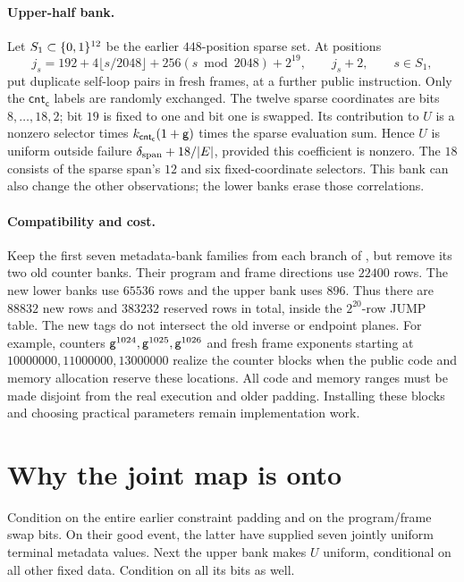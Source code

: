 \documentclass[11pt]{article}
\begin{document}
\paragraph{Upper-half bank.} Let $S_1\subset\{0,1\}^{12}$ be the earlier $448$-position sparse set. At positions
\[
 j_s=192+4\lfloor s/2048\rfloor+256(s\bmod2048)+2^{19},
 \qquad j_s+2,\qquad s\in S_1,
\]
put duplicate self-loop pairs in fresh frames, at a further public instruction. Only the $\mathsf{cnt_c}$ labels are randomly exchanged. The twelve sparse coordinates are bits $8,\ldots,18,2$; bit $19$ is fixed to one and bit one is swapped. Its contribution to $U$ is a nonzero selector times $k_{\mathsf{cnt_c}}(1+\mathsf{g})$ times the sparse evaluation sum. Hence $U$ is uniform outside failure $\delta_{\mathrm{span}}+18/|E|$, provided this coefficient is nonzero. The $18$ consists of the sparse span's $12$ and six fixed-coordinate selectors. This bank can also change the other observations; the lower banks erase those correlations.

\paragraph{Compatibility and cost.} Keep the first seven metadata-bank families from each branch of , but remove its two old counter banks. Their program and frame directions use $22400$ rows. The new lower banks use $65536$ rows and the upper bank uses $896$. Thus there are $88832$ new rows and $383232$ reserved rows in total, inside the $2^{20}$-row JUMP table. The new tags do not intersect the old inverse or endpoint planes. For example, counters $\mathsf{g}^{1024},\mathsf{g}^{1025},\mathsf{g}^{1026}$ and fresh frame exponents starting at $10000000,11000000,13000000$ realize the counter blocks when the public code and memory allocation reserve these locations. All code and memory ranges must be made disjoint from the real execution and older padding. Installing these blocks and choosing practical parameters remain implementation work.

\section{Why the joint map is onto}

Condition on the entire earlier constraint padding and on the program/frame swap bits. On their good event, the latter have supplied seven jointly uniform terminal metadata values. Next the upper bank makes $U$ uniform, conditional on all other fixed data. Condition on all its bits as well.
\end{document}
